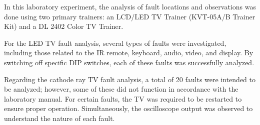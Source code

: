 \documentclass[a4paper,12pt]{article}
\begin{document}
	
In this laboratory experiment, the analysis of fault locations and observations was done using two primary trainers: an LCD/LED TV Trainer (KVT-05A/B Trainer Kit) and a DL 2402 Color TV Trainer.

For the LED TV fault analysis, several types of faults were investigated, including those related to the IR remote, keyboard, audio, video, and display. By switching off specific DIP switches, each of these faults was successfully analyzed.

Regarding the cathode ray TV fault analysis, a total of 20 faults were intended to be analyzed; however, some of these did not function in accordance with the laboratory manual. For certain faults, the TV was required to be restarted to ensure proper operation. Simultaneously, the oscilloscope output was observed to understand the nature of each fault.
\end{document}
